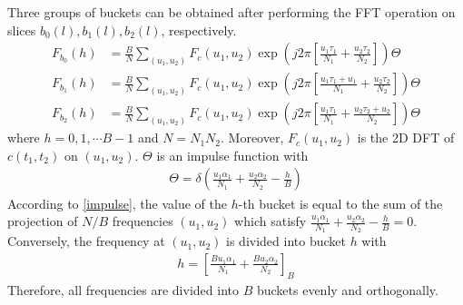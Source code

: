 \documentclass[conference]{IEEEtran}
\begin{document}
Three groups of buckets can be obtained after performing the FFT operation on slices ${b_0}(l),{b_1}(l),{b_2}(l)$, respectively. 
\begin{align}
	{F_{{b_0}}}(h) &= \frac{B}{N}\sum\limits_{({u_1},{u_2})} {{F_c}({u_1},{u_2})\exp (j2\pi [\frac{{{u_1}{\tau _1}}}{{{N_1}}} + \frac{{{u_2}{\tau _2}}}{{{N_2}}}])} \Theta \\
	{F_{{b_1}}}(h) &= \frac{B}{N}\sum\limits_{({u_1},{u_2})} {{F_c}({u_1},{u_2})\exp (j2\pi [\frac{{{u_1}{\tau _1} + {u_1}}}{{{N_1}}} + \frac{{{u_2}{\tau _2}}}{{{N_2}}}])} \Theta \\
	{F_{{b_2}}}(h) &= \frac{B}{N}\sum\limits_{({u_1},{u_2})} {{F_c}({u_1},{u_2})\exp (j2\pi [\frac{{{u_1}{\tau _1}}}{{{N_1}}} + \frac{{{u_2}{\tau _2} + {u_2}}}{{{N_2}}}])} \Theta
\end{align}
where $h = 0,1, \cdots B - 1$ and $N = {N_1}{N_2}$. Moreover, ${F_c}({u_1},{u_2})$ is the 2D DFT of ${c}({t_1},{t_2})$ on $({u_1},{u_2})$. $\Theta $ is an impulse function with
\begin{align} \label{impulse}
	 \Theta  = \delta (\frac{{{u_1}{\alpha _1}}}{{{N_1}}} + \frac{{{u_2}{\alpha _2}}}{{{N_2}}} - \frac{h}{B})
\end{align}
According to \eqref{impulse}, the value of the $h$-th bucket is equal to the sum of the projection of $N/B$ frequencies $(u_1,u_2)$ which satisfy $\frac{{{u_1}{\alpha _1}}}{{{N_1}}} + \frac{{{u_2}{\alpha _2}}}{{{N_2}}} - \frac{h}{B} = 0$. Conversely, the frequency at $(u_1,u_2 )$ is divided into bucket $h$ with
\begin{align}
	h = {\left[\frac{{B{u_1}{\alpha _1}}}{{{N_1}}} + \frac{{B{u_2}{\alpha _2}}}{{{N_2}}}\right]_B} 
\end{align}
Therefore, all frequencies are divided into $B$ buckets evenly and orthogonally.
\end{document}

